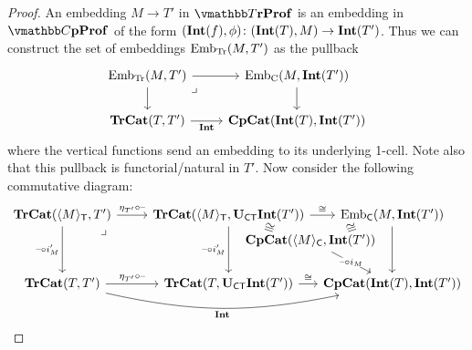 \documentclass[12pt,oneside,article,draft]{memoir}
\begin{document}
\begin{proof}
   An embedding $M\to T'$ in $\dTrProf$ is an embedding in $\dCompProf$ of the form
   $(\mathbf{Int}(f),\phi)\colon(\mathbf{Int}(T),M)\to\mathbf{Int}(T')$. Thus we can construct the set of embeddings
   $\mathrm{Emb}_{\mathrm{Tr}}(M,T')$ as the pullback
   \begin{equation}\label{eq:Emb_Tr}
      \begin{tikzcd}
         \Emb_{\mathrm{Tr}}(M,T') \ar[r] \ar[d] \ar[dr,phantom,"\lrcorner" very near start]
            & \Emb_{\mathrm{C}}(M,\Int(T')) \ar[d] \\
         \TrCat(T,T') \ar[r,"\Int"'] & \CompCat(\Int(T),\Int(T'))
      \end{tikzcd}
   \end{equation}
   where the vertical functions send an embedding to its underlying 1-cell. Note also that this
   pullback is functorial/natural in $T'$. Now consider the following commutative diagram:
   \begin{equation*}
      \begin{tikzcd}[column sep=between origins,row sep=between origins]
         \TrCat(\Col{M}_{\MTCfont{T}},T')
               \ar[r,"\eta_{T'}\circ\textrm{--}"]
               \ar[dd,"\textrm{--}\circ i'_M"']
               \ar[ddr,phantom,"\lrcorner" very near start]
            &[2.4em,between borders] \TrCat(\Col{M}_{\MTCfont{T}},\UCT\Int(T'))
               \ar[dr,phantom,"\iso"' sloped]
               \ar[dd,"\textrm{--}\circ i'_M"']
               \ar[rr,"\iso"]
            &[6.4em]
            &[6.4em] \Emb_{\MTCfont{C}}(M,\Int(T')) \ar[dd] \\[2em]
         && \CompCat(\Col{M}_{\MTCfont{C}},\Int(T'))
               \ar[ur,phantom,"\iso" sloped]
               \ar[dr,"\textrm{--}\circ i_M" {description,inner sep=.2ex}] \\[3.4em]
         \TrCat(T,T')
               \ar[r,"\eta_{T'}\circ\textrm{--}"]
               \ar[rrr,bend right=12,"\Int"']
            & \TrCat(T,\UCT\Int(T'))
               \ar[rr,"\iso"] 
            && \CompCat(\Int(T),\Int(T'))
      \end{tikzcd}
   \end{equation*}

\end{proof}
\end{document}

